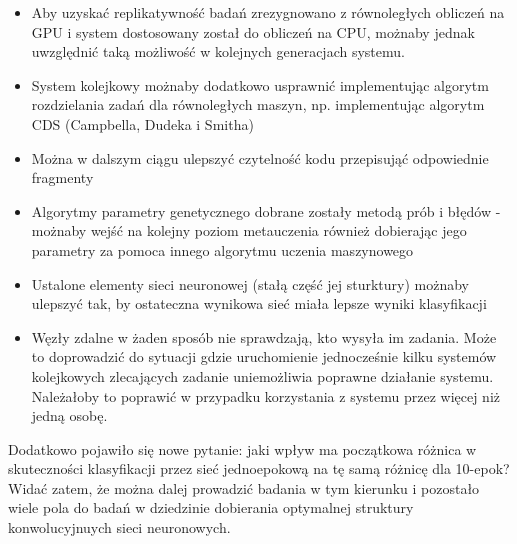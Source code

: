 \begin{itemize}
  \item Aby uzyskać replikatywność badań zrezygnowano z równoległych obliczeń na GPU i system dostosowany został do obliczeń na CPU, możnaby jednak uwzględnić taką możliwość w kolejnych generacjach systemu.
  \item System kolejkowy możnaby dodatkowo usprawnić implementując algorytm rozdzielania zadań dla równoległych maszyn, np. implementując algorytm CDS (Campbella, Dudeka i Smitha)
  \item Można w dalszym ciągu ulepszyć czytelność kodu przepisująć odpowiednie fragmenty
  \item Algorytmy parametry genetycznego dobrane zostały metodą prób i błędów - możnaby wejść na kolejny poziom metauczenia również dobierając jego parametry za pomoca innego algorytmu uczenia maszynowego\
  \item Ustalone elementy sieci neuronowej (stałą część jej sturktury) możnaby ulepszyć tak, by ostateczna wynikowa sieć miała lepsze wyniki klasyfikacji
  \item Węzły zdalne w żaden sposób nie sprawdzają, kto wysyła im zadania.
  Może to doprowadzić do sytuacji gdzie uruchomienie jednocześnie kilku systemów kolejkowych zlecających zadanie uniemożliwia poprawne działanie systemu.
  Należałoby to poprawić w przypadku korzystania z systemu przez więcej niż jedną osobę.
\end{itemize}

Dodatkowo pojawiło się nowe pytanie: jaki wpływ ma początkowa różnica w skuteczności klasyfikacji przez sieć jednoepokową na tę samą różnicę dla 10-epok?
Widać zatem, że można dalej prowadzić badania w tym kierunku i pozostało wiele pola do badań w dziedzinie dobierania optymalnej struktury konwolucyjnuych sieci neuronowych.

